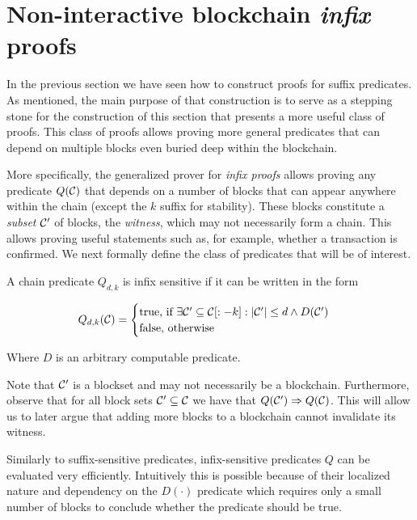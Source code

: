 \section{Non-interactive blockchain \emph{infix} proofs}
\label{sec:infix}

In the previous section we have seen how to construct proofs for suffix
predicates. As mentioned, the main purpose of that construction is to serve as a
stepping stone for the construction of this section that presents a more useful
class of proofs. This class of proofs allows proving more general predicates
that can depend on multiple blocks even buried deep within the blockchain.

More specifically, the generalized prover for \emph{infix proofs} allows
proving any predicate $Q(\mathcal{C})$ that depends on a number of blocks that can
appear anywhere within the chain (except the $k$ suffix for stability). These
blocks constitute a \emph{subset} $\mathcal{C}'$ of blocks, the \emph{witness},
which may not necessarily form a chain. This allows proving useful statements
such as, for example, whether a transaction is confirmed. We next formally
define the class of predicates that will be of interest.

\begin{definition}
\label{def:infix}
A chain predicate $Q_{d,k}$ is \textnormal{infix sensitive} if it can be
written in the form

$$
Q_{d,k}(\mathcal{C}) =
\begin{cases}
  \text{true, if }
    \exists \mathcal{C}' \subseteq \mathcal{C}[:-k]: |\mathcal{C}'| \leq d \land D(\mathcal{C}')\\
  \text{false, otherwise}
\end{cases}
$$

Where $D$ is an arbitrary computable predicate.
\end{definition}

Note that $\mathcal{C}'$ is a blockset and may not necessarily be a blockchain.
Furthermore, observe that for all block sets $\mathcal{C}' \subseteq \mathcal{C}$ we have
that $Q(\mathcal{C}') \Rightarrow Q(\mathcal{C})$. This will allow us to later argue that
adding more blocks to a blockchain cannot invalidate its witness.

Similarly to suffix-sensitive predicates, infix-sensitive predicates $Q$ can be
evaluated very efficiently. Intuitively this is possible because of their
localized nature and dependency on the $D(\cdot)$ predicate which requires only
a small number of blocks to conclude whether the predicate should be true.

